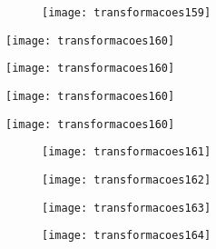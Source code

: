 \begin{figure}[H]
\centering

\texttt{[image: transformacoes159]}
\end{figure}

\begin{multicols}{2}


\texttt{[image: transformacoes160]}

\texttt{[image: transformacoes160]}

\texttt{[image: transformacoes160]}

\texttt{[image: transformacoes160]}

\end{multicols}

\anexo

\begin{figure}[H]
\centering

\texttt{[image: transformacoes161]}
\end{figure}

\anexo

\begin{figure}[H]
\centering

\texttt{[image: transformacoes162]}
\end{figure}

\anexo

\begin{figure}[H]
\centering

\texttt{[image: transformacoes163]}
\end{figure}

\begin{figure}[H]
\centering

\texttt{[image: transformacoes164]}
\end{figure}

\anexo

\setlength\columnsep{2em}

